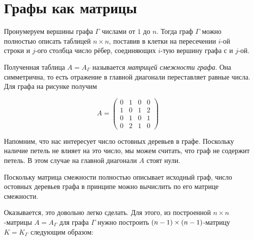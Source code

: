 \documentclass{article}
\begin{document}
\section{Графы как матрицы}


{

\begin{wrapfigure}{r}{32 mm}
\end{wrapfigure}

Пронумеруем вершины графа $\Gamma$ числами от $1$ до $n$.
Тогда граф $\Gamma$ можно полностью описать таблицей $n\times n$, поставив в клетки на пересечении $i$-ой строки и $j$-ого столбца число рёбер, соединяющих $i$-тую вершину графа с и $j$-ой.

}

Полученная таблица $A=A_\Gamma$ называется \emph{матрицей смежности графа}.
Она симметрична, то есть отражение в главной диагонали переставляет равные числа.
Для графа на рисунке получим 

\[A=\left(
\begin{matrix}
0&1&0&0
\\
1&0&1&2
\\
0&1&0&1
\\
0&2&1&0
\end{matrix}
\right)\]

Напомним, что нас интересует число остовных деревьев в графе.
Поскольку наличие петель не влияет на это число, мы можем считать, что граф не содержит петель.
В этом случае на главной диагонали $A$ стоят нули.

Поскольку матрица смежности полностью описывает исходный граф, 
число остовных деревьев графа в принципе можно вычислить по его матрице смежности.

Оказывается, это довольно легко сделать.
Для этого, из построенной $n\times n$-матрицы  $A=A_\Gamma$ для графа $\Gamma$ нужно построить $(n-1)\z\times(n-1)$-матрицу $K=K_\Gamma$ следующим образом: 
\end{document}
